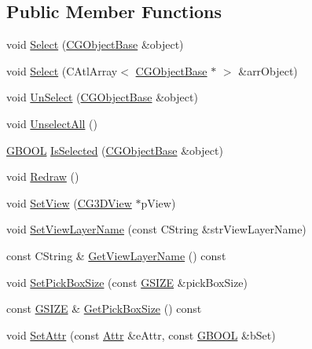 \subsection*{Public Member Functions}
\begin{DoxyCompactItemize}
\item 
void \hyperlink{class_c_g_selection_manager_aa4da7a1df1f0c7dc45f011b6ed5eca1c}{Select} (\hyperlink{class_c_g_object_base}{C\+G\+Object\+Base} \&object)
\item 
void \hyperlink{class_c_g_selection_manager_aacfaa13ffa45ba8209d4a0f614a756eb}{Select} (C\+Atl\+Array$<$ \hyperlink{class_c_g_object_base}{C\+G\+Object\+Base} $\ast$ $>$ \&arr\+Object)
\item 
void \hyperlink{class_c_g_selection_manager_ae91f54f3dafb5d1f58157a30f342387c}{Un\+Select} (\hyperlink{class_c_g_object_base}{C\+G\+Object\+Base} \&object)
\item 
void \hyperlink{class_c_g_selection_manager_ae6367522d4e57d57346ae54ea0a6eb03}{Unselect\+All} ()
\item 
\hyperlink{_g_types_8h_a2901915743626352a6820c5405f556dc}{G\+B\+O\+O\+L} \hyperlink{class_c_g_selection_manager_a3290a680a184c830fb1632cac97b3973}{Is\+Selected} (\hyperlink{class_c_g_object_base}{C\+G\+Object\+Base} \&object)
\item 
void \hyperlink{class_c_g_selection_manager_a2ba62850c8892b94deee3503992cf29f}{Redraw} ()
\item 
void \hyperlink{class_c_g_selection_manager_a64aa504d70f8e93631181c0aff2fcaaa}{Set\+View} (\hyperlink{class_c_g3_d_view}{C\+G3\+D\+View} $\ast$p\+View)
\item 
void \hyperlink{class_c_g_selection_manager_ae379da48212e5d9df4a12fc32bbd7f9e}{Set\+View\+Layer\+Name} (const C\+String \&str\+View\+Layer\+Name)
\item 
const C\+String \& \hyperlink{class_c_g_selection_manager_aed946eb76c5c75bcda1c2c15af6fd523}{Get\+View\+Layer\+Name} () const 
\item 
void \hyperlink{class_c_g_selection_manager_aabb3c7b605a91d7549c31392503a2bbd}{Set\+Pick\+Box\+Size} (const \hyperlink{_g_types_8h_ac7dd75e8df268a0368c6cb433764fdcb}{G\+S\+I\+Z\+E} \&pick\+Box\+Size)
\item 
const \hyperlink{_g_types_8h_ac7dd75e8df268a0368c6cb433764fdcb}{G\+S\+I\+Z\+E} \& \hyperlink{class_c_g_selection_manager_a1aede63c1207f11cf2239888650409a8}{Get\+Pick\+Box\+Size} () const 
\item 
void \hyperlink{class_c_g_selection_manager_af44239e28ef601284f9b2ab13b09e30f}{Set\+Attr} (const \hyperlink{class_c_g_selection_manager_aab4b2c908e93e2d28ab119d441d70b18}{Attr} \&e\+Attr, const \hyperlink{_g_types_8h_a2901915743626352a6820c5405f556dc}{G\+B\+O\+O\+L} \&b\+Set)

\end{DoxyCompactItemize}
